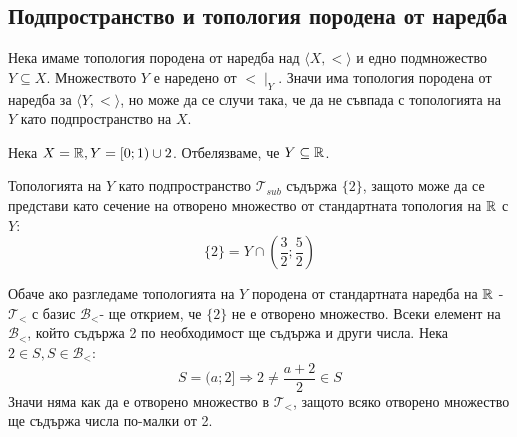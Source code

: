 \subsection{Подпространство и топология породена от наредба}
Нека имаме топология породена от наредба над $\langle X, < \rangle$ и едно подмножество $Y \subseteq X$. Множеството $Y$ е наредено от $< \mid_Y$. Значи има топология породена от наредба за $\langle Y, < \rangle$, но може да се случи така, че да не съвпада с топологията на $Y$ като подпространство на $X$.
\begin{example}
    Нека $X = {\mathbb{R}}, Y = [0; 1) \cup {2}$. Отбелязваме, че $Y \subseteq {\mathbb{R}}$.
    
    Топологията на $Y$ като подпространство $\mathcal T_{sub}$ съдържа $\{2\}$, защото може да се представи като сечение на отворено множество от стандартната топология на ${\mathbb{R}}$ с $Y$:
    \begin{equation}
        \{2\} = Y \cap \left(\frac{3}{2}; \frac{5}{2}\right)
    \end{equation}

    Обаче ако разгледаме топологията на $Y$ породена от стандартната наредба на ${\mathbb{R}}$ - $\mathcal T_<$ с базис $\mathcal B_<$-  ще открием, че $\{2\}$ не е отворено множество. Всеки елемент на $\mathcal B_<$, който съдържа 2 по необходимост ще съдържа и други числа. Нека $2 \in S, S \in \mathcal B_<$:
    \begin{equation}
        S = (a; 2] \Rightarrow 2 \neq \frac{a + 2}{2} \in S
    \end{equation}
    Значи няма как да е отворено множество в $\mathcal T_<$, защото всяко отворено множество ще съдържа числа по-малки от 2.
\end{example}

